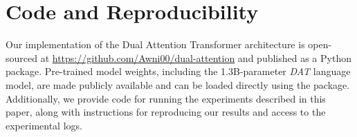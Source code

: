 \section*{Code and Reproducibility}

Our implementation of the Dual Attention Transformer architecture is open-sourced at \url{https://github.com/Awni00/dual-attention} and published as a Python package. Pre-trained model weights, including the 1.3B-parameter \textit{DAT} language model, are made publicly available and can be loaded directly using the package. Additionally, we provide code for running the experiments described in this paper, along with instructions for reproducing our results and access to the experimental logs. %

